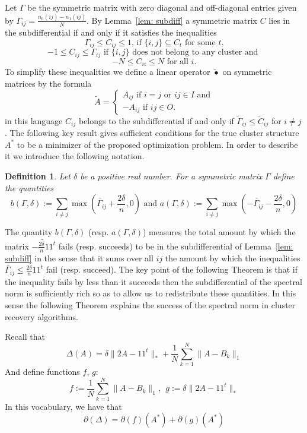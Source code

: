 \documentclass[12pt]{amsart}
\newtheorem{definition}[lemma]{Definition}
\theoremstyle{remark}
\begin{document}
Let $\Gamma$ be the symmetric matrix with zero diagonal and off-diagonal entries given by
$\Gamma_{ij}=\frac{n_0(ij)-n_1(ij)}{N}$. By Lemma~\ref{lem: subdiff} a symmetric matrix $C$ lies in the subdifferential if and only if it satisfies the inequalities
\[ \Gamma_{ij}\leq C_{ij}\leq 1 \text{, if $\{i,j\}\subseteq C_t$ for some $t$,}\]
\[-1\leq C_{ij} \leq \Gamma_{ij} \text{ if $\{i,j\}$ does not belong to any cluster and } \]
\[-N \leq C_{ii} \leq N \text{ for all }i.\]
To simplify these inequalities we define a linear operator $\widetilde{\bullet}$ on symmetric matrices by the formula
\[ \widetilde{A} = 
\begin{cases}
A_{ij}\text{ if $i=j$ or $ij\in I$ and}\\
-A_{ij}\text{ if $ij\in O$.} 
\end{cases}
\]
in this language $C_{ij}$ belongs to the subdifferential if and only if $\widetilde{\Gamma}_{ij}\leq \widetilde{C}_{ij}$ for $i\neq j$.
The following key result gives sufficient conditions for the true cluster structure $A^*$ to be a minimizer of the proposed optimization problem. In order to describe it we introduce the following notation. 

\begin{definition} Let $\delta$ be a positive real number. For a symmetric matrix $\Gamma$ define the quantities
\[b(\Gamma,\delta):=\sum_{i\neq j} \max\left(\widetilde{\Gamma_{ij}}+\frac{2\delta}{n},0\right)
\text{ and } a(\Gamma,\delta):=\sum_{i\neq j} \max\left(-\widetilde{\Gamma_{ij}}-\frac{2\delta}{n},0\right)
\]\end{definition}
The quantity $b(\Gamma,\delta)$ (resp. $a(\Gamma,\delta)$) measures the total amount by which the matrix $\widetilde{-\frac{2\delta}{n}11^t}$ fails (resp. succeeds) to be in the subdifferential of Lemma~\ref{lem: subdiff} in the sense that it sums over all $ij$ the amount by which the inequalities $\widetilde{\Gamma_{ij}}\leq \frac{2\delta}{n} 11^t$ fail (resp. succeed). The key point of the following Theorem is that if the inequality fails by less than it succeeds then the subdifferential of the spectral norm is sufficiently rich so as to allow us to redistribute these quantities. In this sense the following Theorem explains the success of the spectral norm in cluster recovery algorithms. 


Recall that 
\[\Delta(A)= \delta\|2A-11^t\|_{*}+\frac{1}{N}\sum_{k=1}^N\|A-B_k\|_1\] 
And define functions $f$, $g$:
\[
f:= \frac{1}{N}\sum_{k=1}^N\|A-B_k\|_1, \ \ g:= \delta\|2A-11^t\|_{*}
\]
In this vocabulary, we have that
\begin{equation}\label{SumaSubDif}
\partial(\Delta) = \partial(f)(A^*)+\partial(g)(A^*)
\end{equation}
\end{document}

